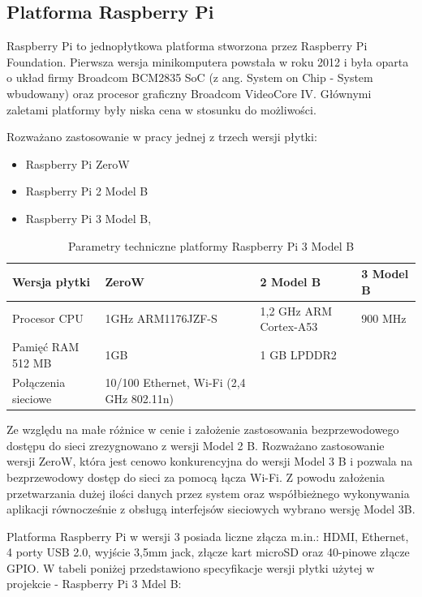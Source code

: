 \subsection{Platforma Raspberry Pi}

Raspberry Pi to jednopłytkowa platforma stworzona przez Raspberry Pi Foundation. Pierwsza wersja minikomputera powstała w roku 2012 i była oparta o układ firmy Broadcom BCM2835 SoC (z ang. System on Chip - System wbudowany) oraz procesor graficzny Broadcom VideoCore IV. Głównymi zaletami platformy były niska cena w stosunku do możliwości.

Rozważano zastosowanie w pracy jednej z trzech wersji płytki:
\begin{itemize}
\item Raspberry Pi ZeroW
\item Raspberry Pi 2 Model B
\item Raspberry Pi 3 Model B, 
\end{itemize}

\begin{table}[t]
\label{tabRpi}
\centering
\begin{tabular}{|l|l|l|l|}
  \hline 
  Wersja płytki & ZeroW & 2 Model B & 3 Model B\\
  \hline
  Procesor CPU & 1GHz ARM1176JZF-S & 1,2 GHz ARM Cortex-A53 &  900 MHz \\
  \hline
  Pamięć RAM  512 MB & 1GB & 1 GB LPDDR2 &\\
  \hline
 Połączenia sieciowe & 10/100 Ethernet, Wi-Fi (2,4 GHz 802.11n) \\
  \hline

\end{tabular}
\caption{Parametry techniczne platformy Raspberry Pi 3 Model B 
\cite{rpispecs}
} 
\end{table}

Ze względu na małe różnice w cenie i założenie zastosowania bezprzewodowego dostępu do sieci zrezygnowano z wersji Model 2 B. Rozważano zastosowanie wersji ZeroW, która jest cenowo konkurencyjna do wersji Model 3 B i pozwala na bezprzewodowy dostęp do sieci za pomocą łącza Wi-Fi. Z powodu założenia przetwarzania dużej ilości danych przez system oraz współbieżnego wykonywania aplikacji równocześnie z obsługą interfejsów sieciowych wybrano wersję Model 3B.

 
Platforma Raspberry Pi w wersji 3 posiada liczne złącza m.in.: HDMI, Ethernet, 4 porty USB 2.0, wyjście 3,5mm jack, złącze kart microSD oraz 40-pinowe złącze GPIO. W tabeli poniżej przedstawiono specyfikacje wersji płytki użytej w projekcie - Raspberry Pi 3 Mdel B:

